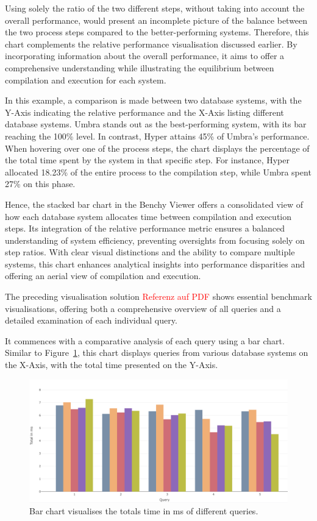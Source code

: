Using solely the ratio of the two different steps, without taking into account the overall performance, would present an incomplete picture of the balance between the two process steps compared to the better-performing systems. Therefore, this chart complements the relative performance visualisation discussed earlier. By incorporating information about the overall performance, it aims to offer a comprehensive understanding while illustrating the equilibrium between compilation and execution for each system.

In this example, a comparison is made between two database systems, with the Y-Axis indicating the relative performance and the X-Axis listing different database systems. Umbra stands out as the best-performing system, with its bar reaching the 100\% level. In contrast, Hyper attains 45\% of Umbra's performance. When hovering over one of the process steps, the chart displays the percentage of the total time spent by the system in that specific step. For instance, Hyper allocated 18.23\% of the entire process to the compilation step, while Umbra spent 27\% on this phase.

Hence, the stacked bar chart in the Benchy Viewer offers a consolidated view of how each database system allocates time between compilation and execution steps. Its integration of the relative performance metric ensures a balanced understanding of system efficiency, preventing oversights from focusing solely on step ratios. With clear visual distinctions and the ability to compare multiple systems, this chart enhances analytical insights into performance disparities and offering an aerial view of compilation and execution.

The preceding visualisation solution \textcolor{red}{Referenz auf PDF} shows essential benchmark visualisations, offering both a comprehensive overview of all queries and a detailed examination of each individual query.

It commences with a comparative analysis of each query using a bar chart. Similar to Figure~\ref{fig:bar-chart}, this chart displays queries from various database systems on the X-Axis, with the total time presented on the Y-Axis. 

\begin{figure}[h]
    \centering
    \includegraphics[width=1\linewidth]{figures/bsp-bar.png}
    \caption{Bar chart visualises the totals time in ms of different queries.}
    \label{fig:bar-chart}
  \end{figure}


